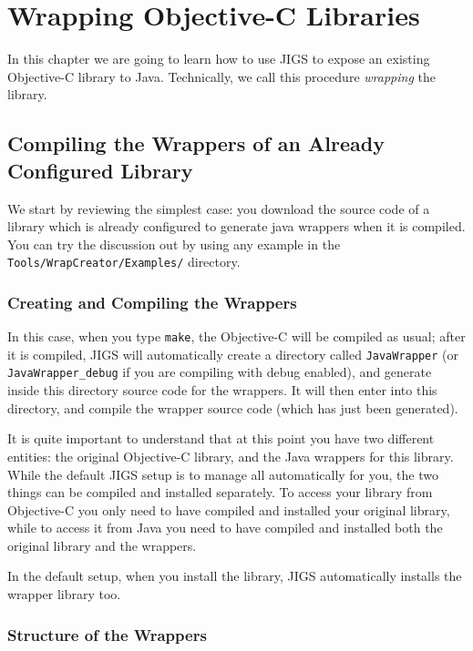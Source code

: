 \chapter{Wrapping Objective-C Libraries}

In this chapter we are going to learn how to use JIGS to expose an
existing Objective-C library to Java.  Technically, we call this
procedure {\sl wrapping} the library.  

\section{Compiling the Wrappers of an Already Configured Library}
We start by reviewing the simplest case: you download the source code
of a library which is already configured to generate java wrappers
when it is compiled.  You can try the discussion out by using any
example in the \texttt{Tools/WrapCreator/Examples/} directory.

\subsection{Creating and Compiling the Wrappers}

In this case, when you type \texttt{make}, the Objective-C will be
compiled as usual; after it is compiled, JIGS will automatically
create a directory called \texttt{JavaWrapper} (or
\texttt{JavaWrapper\_debug} if you are compiling with debug enabled),
and generate inside this directory source code for the wrappers.  It
will then enter into this directory, and compile the wrapper source
code (which has just been generated).

It is quite important to understand that at this point you have two
different entities: the original Objective-C library, and the Java
wrappers for this library.  While the default JIGS setup is to manage
all automatically for you, the two things can be compiled and
installed separately.  To access your library from Objective-C you
only need to have compiled and installed your original library, while
to access it from Java you need to have compiled and installed both
the original library and the wrappers.

In the default setup, when you install the library, JIGS automatically
installs the wrapper library too.

\subsection{Structure of the Wrappers}\label{wrapper-structure}

